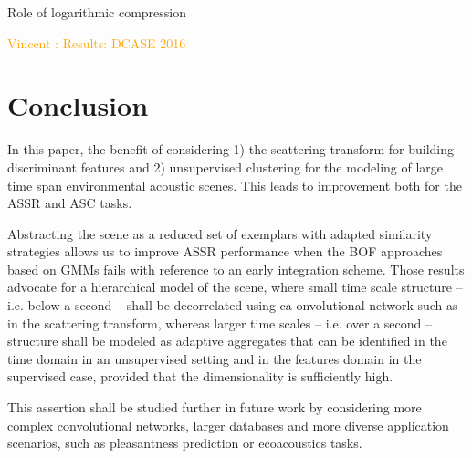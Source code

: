 \documentclass[journal]{IEEEtran}
\makeatletter
\newcommand*{\ie}{i.e.\@\xspace}
\newcommand{\vl}[1]{\textcolor{orange}{Vincent : #1}}
\makeatother
\begin{document}
Role of logarithmic compression

\vl{Results: DCASE 2016}

\section{Conclusion}

In this paper, the benefit of considering 1) the scattering transform for building discriminant features and 2) unsupervised clustering for the modeling of large time span environmental acoustic scenes.
This leads to improvement both for the ASSR and ASC tasks.

Abstracting the scene as a reduced set of exemplars with adapted similarity strategies allows us to improve ASSR performance when the BOF approaches based on GMMs fails with reference to an early integration scheme. Those results advocate for a hierarchical model of the scene, where small time scale structure -- \ie below a second -- shall be decorrelated using ca onvolutional network such as in the scattering transform, whereas larger time scales -- \ie over a second -- structure shall be modeled as adaptive aggregates that can be identified in the time domain in an unsupervised setting and in the features domain in the supervised case, provided that the dimensionality is sufficiently high.

This assertion shall be studied further in future work by considering more complex convolutional networks, larger databases and more diverse application scenarios, such as pleasantness prediction \cite{lafaySoundscapePilot, lafay:hal-01111782} or ecoacoustics tasks.




% 

\end{document}
